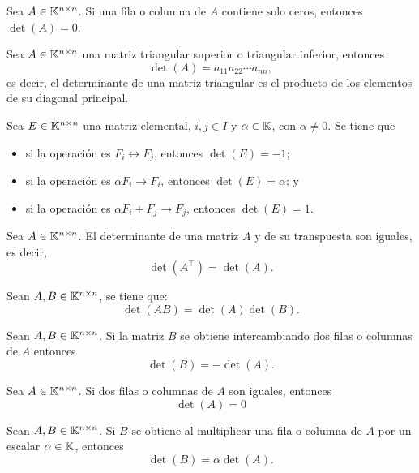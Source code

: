 \documentclass[a4,11pt]{aleph-notas}
\begin{document}
\begin{teo}
    Sea $A \in \Mat[\K]{n}{n}$. Si una fila o columna de $A$ contiene solo ceros, entonces $\det (A) =0$.
\end{teo}


\begin{teo}
    Sea $A \in \Mat[\K]{n}{n}$ una matriz triangular superior o triangular inferior, entonces
    \[
        \det(A) = a_{11}a_{22} \cdots a_{nn},
    \]
    es decir, el determinante de una matriz triangular es el producto de los elementos de su diagonal principal.
\end{teo}


\begin{teo}
    Sea $E\in\Mat[\K]{n}{n}$ una matriz elemental, $i,j\in I$ y $\alpha\in\K$, con $\alpha\neq 0$. Se tiene que
    \begin{itemize}
    \item   
        si la operación es $F_i \leftrightarrow F_j$, entonces $\det(E) = - 1$;
    \item 
        si la operación es $\alpha F_i \rightarrow F_i$, entonces $\det(E) = \alpha$; y
    \item 
        si la operación es $\alpha F_i + F_j\rightarrow F_j$, entonces $\det(E) = 1$.
    \end{itemize}
\end{teo}

\begin{teo}
    Sea $A \in \Mat[\K]{n}{n}$. El determinante de una matriz $A$ y de su transpuesta son iguales, es decir, 
    \[
        \det(A^\intercal) = \det(A).
    \]
\end{teo}

\begin{teo}
    Sean $A, B\in \Mat[\K]{n}{n}$, se tiene que:
    \[
        \det(AB) = \det(A)\det(B).
    \]
\end{teo}


\begin{teo}
    Sean $A, B \in \Mat[\K]{n}{n}$. Si la matriz $B$ se obtiene intercambiando dos filas o columnas de $A$ entonces
    \[  
        \det(B) = - \det(A).
    \]
\end{teo}

\begin{teo}
    Sea $A \in \Mat[\K]{n}{n}$. Si dos filas o columnas de $A$ son iguales, entonces 
    \[
        \det(A) = 0
    \]
\end{teo}

\begin{teo}
    Sean $A, B \in \Mat[\K]{n}{n}$. Si $B$ se obtiene al multiplicar una fila o columna de $A$ por un escalar $\alpha \in \K$, entonces
    \[
        \det(B) = \alpha \det(A).
    \]
\end{teo}
\end{document}
